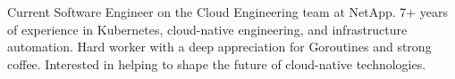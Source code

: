 

\begin{cvparagraph}

Current Software Engineer on the Cloud Engineering team at NetApp. 7+ years of experience in Kubernetes, cloud-native engineering, and infrastructure automation. Hard worker with a deep appreciation for Goroutines and strong coffee. Interested in helping to shape the future of cloud-native technologies.
\end{cvparagraph}
